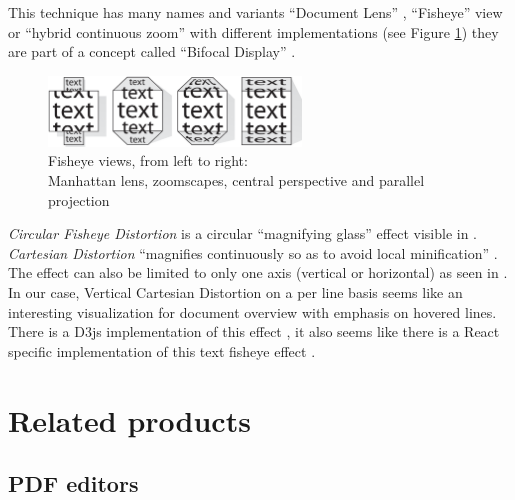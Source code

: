 \documentclass{l4proj}
\begin{document}
This technique has many names and variants ``Document Lens'' \autocite{robertsonDocumentLens1993}, ``Fisheye'' view \autocite{greenbergFisheyeTextEditor1996} or ``hybrid continuous zoom'' \autocite{bartramContinuousZoomConstrained1995} with different implementations (see Figure \ref{fig:fisheyes}) they are part of a concept called ``Bifocal Display'' \autocite{apperleyBifocalDisplay}.

\begin{figure}[H]
    \centering
    \includegraphics[width=0.6\textwidth]{images/document_visualization/different-fisheyes.png}
    \caption{Fisheye views, from left to right: \\
        Manhattan lens, zoomscapes, central perspective and parallel projection \\
        \protect\autocite{baudischFishnetFisheyeWeb2004}}
    \label{fig:fisheyes}
\end{figure}

\textit{Circular Fisheye Distortion} is a circular ``magnifying glass'' effect visible in \textcite{bostockFisheyeGrid2019}. \textit{Cartesian Distortion} ``magnifies continuously so as to avoid local minification'' \autocite{bostockFisheyeDistortion2012}. The effect can also be limited to only one axis (vertical or horizontal) as seen in \textcite{pstuffaCartesianFisheyeDistortion2019}. In our case, Vertical Cartesian Distortion on a per line basis seems like an interesting visualization for document overview with emphasis on hovered lines. There is a D3js implementation of this effect \autocite{pstuffaCartesianFisheyeDistortion2019}, it also seems like there is a React specific implementation of this text fisheye effect \autocite{zhongVincentdchanReactfisheye2019}.

\section{Related products}

\subsection{PDF editors}
\end{document}
